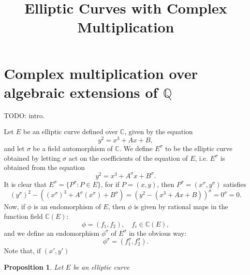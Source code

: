 \documentclass{amsart}
\title{Elliptic Curves with Complex Multiplication}
\newtheorem{prop}{Proposition}[subsection]
\theoremstyle{definition}
\begin{document}
\section{Complex multiplication over algebraic extensions of $\mathbb{Q}$}
\label{sec:compl-mult-over-Q}

TODO: intro.

Let $E$ be an elliptic curve defined over $\mathbb{C}$, given by the equation
\begin{equation*}
  y^{2} = x^{3} + Ax + B,
\end{equation*}
and let $\sigma$ be a field automorphism of $\mathbb{C}$. We define $E^{\sigma}$ to be
the elliptic curve obtained by letting $\sigma$ act on the coefficients of the equation
of $E$, i.e. $E^{\sigma}$ is obtained from the equation
\begin{equation*}
  y^{2} = x^{3} + A^{\sigma}x + B^{\sigma}.
\end{equation*}
It is clear that $E^{\sigma} = \{ P^{\sigma} : P \in E \}$, for if $P = (x,y)$, then
$P^{\sigma} = (x^{\sigma},y^{\sigma})$ satisfies
\begin{equation*}
  (y^{\sigma})^{2} - ( (x^{\sigma})^{3} + A^{\sigma}(x^{\sigma}) + B^{\sigma} ) = (y^{2} -
  (x^{3} + Ax + B))^{\sigma} = 0^{\sigma} = 0.
\end{equation*}
Now, if $\phi$ is an endomorphism of $E$, then $\phi$ is given by rational maps in
the function field $\mathbb{C}(E)$:
\begin{equation*}
  \phi = (f_{1},f_{2}), \quad f_{i} \in \mathbb{C}(E),
\end{equation*}
and we define an endomorphism $\phi^{\sigma}$ of $E^{\sigma}$ in the obvious way:
\begin{equation*}
  \phi^{\sigma} = (f_{1}^{\sigma},f_{2}^{\sigma}).
\end{equation*}
Note that, if $(x\prime{},y\prime{})$

\begin{prop}
  \label{prop:j(E)-is-in-Q}
  Let $E$ be an elliptic curve
\end{prop}

\end{document}
